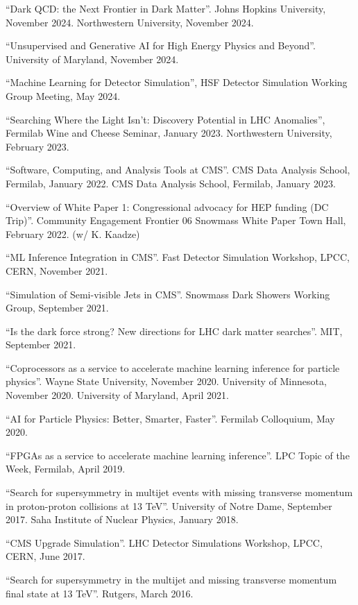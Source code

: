 \begin{description}[leftmargin=12pt,font=\normalfont,labelsep=0em]
\item ``Dark QCD: the Next Frontier in Dark Matter''. Johns Hopkins University, November 2024. Northwestern University, November 2024.
\item ``Unsupervised and Generative AI for High Energy Physics and Beyond''. University of Maryland, November 2024.
\item ``Machine Learning for Detector Simulation'', HSF Detector Simulation Working Group Meeting, May 2024.
\item ``Searching Where the Light Isn't: Discovery Potential in LHC Anomalies'', Fermilab Wine and Cheese Seminar, January 2023. Northwestern University, February 2023.
\item ``Software, Computing, and Analysis Tools at CMS''. CMS Data Analysis School, Fermilab, January 2022. CMS Data Analysis School, Fermilab, January 2023.
\item ``Overview of White Paper 1: Congressional advocacy for HEP funding (DC Trip)''. Community Engagement Frontier 06 Snowmass White Paper Town Hall, February 2022. (w/ K. Kaadze)
\item ``ML Inference Integration in CMS''. Fast Detector Simulation Workshop, LPCC, CERN, November 2021.
\item ``Simulation of Semi-visible Jets in CMS''. Snowmass Dark Showers Working Group, September 2021.
\item ``Is the dark force strong? New directions for LHC dark matter searches''. MIT, September 2021.
\item ``Coprocessors as a service to accelerate machine learning inference for particle physics''. Wayne State University, November 2020. University of Minnesota, November 2020. University of Maryland, April 2021.
\item ``AI for Particle Physics: Better, Smarter, Faster''. Fermilab Colloquium, May 2020.
\item ``FPGAs as a service to accelerate machine learning inference''. LPC Topic of the Week, Fermilab, April 2019.
\item ``Search for supersymmetry in multijet events with missing transverse momentum in proton-proton collisions at 13 TeV''. University of Notre Dame, September 2017. Saha Institute of Nuclear Physics, January 2018.
\item ``CMS Upgrade Simulation''. LHC Detector Simulations Workshop, LPCC, CERN, June 2017.
\item ``Search for supersymmetry in the multijet and missing transverse momentum final state at 13 TeV''. Rutgers, March 2016.

\end{description}
